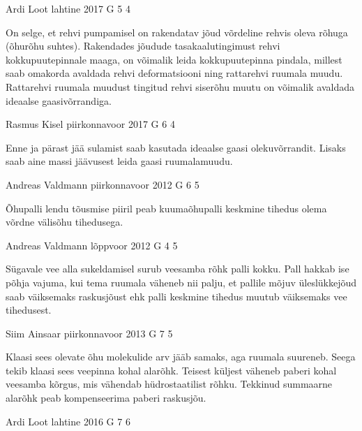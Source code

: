 \documentclass[11pt, twoside]{article}
\begin{document}
{%
{Ardi Loot} %
{lahtine} %
{2017} %
{G 5} %
{4} %
{

\ifHint
On selge, et rehvi pumpamisel on rakendatav jõud võrdeline rehvis oleva rõhuga (õhurõhu suhtes). Rakendades jõudude tasakaalutingimust rehvi kokkupuutepinnale maaga, on võimalik leida kokkupuutepinna pindala, millest saab omakorda avaldada rehvi deformatsiooni ning rattarehvi ruumala muudu. Rattarehvi ruumala muudust tingitud rehvi siserõhu muutu on võimalik avaldada ideaalse gaasivõrrandiga.
\fi
}

{Rasmus Kisel} %
{piirkonnavoor} %
{2017} %
{G 6} %
{4} %
{

\ifHint
Enne ja pärast jää sulamist saab kasutada ideaalse gaasi olekuvõrrandit. Lisaks saab aine massi jäävusest leida gaasi ruumalamuudu.
\fi
}

{Andreas Valdmann} %
{piirkonnavoor} %
{2012} %
{G 6} %
{5} %
{

\ifHint
Õhupalli lendu tõusmise piiril peab kuumaõhupalli keskmine tihedus olema võrdne välisõhu tihedusega.
\fi
}

{Andreas Valdmann} %
{lõppvoor} %
{2012} %
{G 4} %
{5} %
{

\ifHint
Sügavale vee alla sukeldamisel surub veesamba rõhk palli kokku. Pall hakkab ise põhja vajuma, kui tema ruumala väheneb nii palju, et pallile mõjuv üleslükkejõud saab väiksemaks raskusjõust ehk palli keskmine tihedus muutub väiksemaks vee tihedusest.
\fi
}

{Siim Ainsaar} %
{piirkonnavoor} %
{2013} %
{G 7} %
{5} %
{

\ifHint
Klaasi sees olevate õhu molekulide arv jääb samaks, aga ruumala suureneb. Seega tekib klaasi sees veepinna kohal alarõhk. Teisest küljest väheneb paberi kohal veesamba kõrgus, mis vähendab hüdrostaatilist rõhku. Tekkinud summaarne alarõhk peab kompenseerima paberi raskusjõu.
\fi
}

{Ardi Loot} %
{lahtine} %
{2016} %
{G 7} %
{6} %
{

}}
\end{document}
